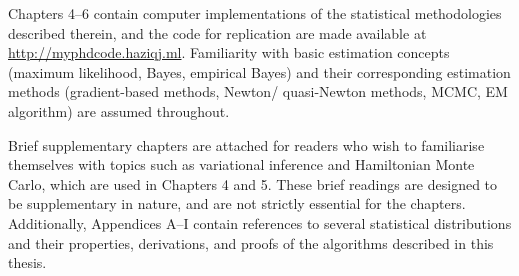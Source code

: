 \documentclass[a4paper,showframe,11pt]{report}
\begin{document}
Chapters 4--6 contain computer implementations of the statistical methodologies described therein, and the code for replication are made available at \url{http://myphdcode.haziqj.ml}.
Familiarity with basic estimation concepts (maximum likelihood, Bayes, empirical Bayes) and their corresponding estimation methods (gradient-based methods, Newton/ quasi-Newton methods, MCMC, EM algorithm) are assumed throughout.

Brief supplementary chapters are attached for readers who wish to familiarise themselves with topics such as variational inference and Hamiltonian Monte Carlo, which are used in Chapters 4 and 5.
These brief readings are designed to be supplementary in nature, and are not strictly essential for the chapters.
Additionally, Appendices A--I contain references to several statistical distributions and their properties, derivations, and proofs of the algorithms described in this thesis.
\end{document}

